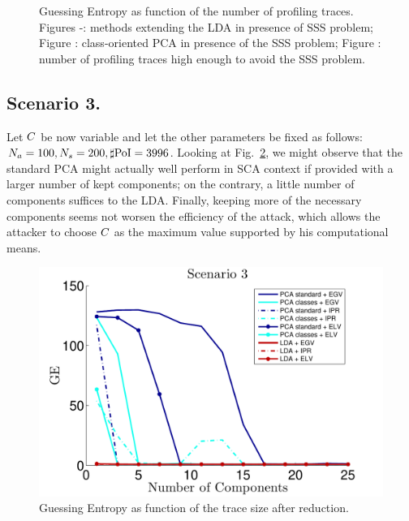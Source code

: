 \begin{figure}
\caption[Guessing Entropy as function of the number of profiling traces.]{Guessing Entropy as function of the number of profiling traces. Figures -: methods extending the LDA in presence of SSS problem; Figure : class-oriented PCA in presence of the SSS problem; Figure : number of profiling traces high enough to avoid the SSS problem.}\label{fig:scenario2}
\end{figure}


\subsection{Scenario 3.}
Let  $C$ be now variable and let the other parameters be fixed as follows: $N_a = 100, N_{s}=200, \sharp\mathrm{PoI} = 3996$. Looking at Fig.~\ref{fig:3}, we might observe that the standard PCA might actually well perform in SCA context if provided with a larger number of kept components; on the contrary, a little number of components suffices to the LDA. Finally, keeping more of the necessary components seems not worsen the efficiency of the attack, which allows the attacker to choose $C$ as the maximum value supported by his computational means. 

\begin{figure}
\centering
\includegraphics[width=.5\textwidth]{../Figures/CARDIS2015/Criterion3.pdf}
\caption{Guessing Entropy as function of the trace size after reduction.}\label{fig:3}
\end{figure}

